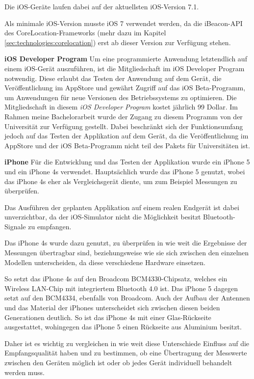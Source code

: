 Die iOS-Geräte laufen dabei auf der aktuellsten iOS-Version 7.1.

Als minimale iOS-Version musste iOS 7 verwendet werden, da die iBeacon-API des CoreLocation-Frameworks (mehr dazu im Kapitel \ref{sec:technologies:corelocation}) erst ab dieser Version zur Verfügung stehen.

\textbf{iOS Developer Program}
Um eine programmierte Anwendung letztendlich auf einem iOS-Gerät auszuführen, ist die Mitgliedschaft im iOS Developer Program notwendig.
Diese erlaubt das Testen der Anwendung auf dem Gerät, die Veröffentlichung im AppStore und gewährt Zugriff auf das iOS Beta-Programm, um Anwendungen für neue Versionen des Betriebssystems zu optimieren.
Die Mitgliedschaft in diesem \emph{iOS Developer Program} kostet jährlich 99 Dollar. 
Im Rahmen meine Bachelorarbeit wurde der Zugang zu diesem Programm von der Universität zur Verfügung gestellt. Dabei beschränkt sich der Funktionsumfang jedoch auf das Testen der Applikation auf dem Gerät, da die Veröffentlichung im AppStore und der iOS Beta-Programm nicht teil des Pakets für Universitäten ist.

\textbf{iPhone}
Für die Entwicklung und das Testen der Applikation wurde ein iPhone 5 und ein iPhone 4s verwendet. 
Hauptsächlich wurde das iPhone 5 genutzt, wobei das iPhone 4s eher als Vergleichsgerät diente, um zum Beispiel Messungen zu überprüfen.

Das Ausführen der geplanten Applikation auf einem realen Endgerät ist dabei unverzichtbar, da der iOS-Simulator nicht die Möglichkeit besitzt Bluetooth-Signale zu empfangen.

Das iPhone 4s wurde dazu genutzt, zu überprüfen in wie weit die Ergebnisse der Messungen übertragbar sind, beziehungsweise wie sie sich zwischen den einzelnen Modellen unterscheiden, da diese verschiedene Hardware einsetzen. 

So setzt das iPhone 4s auf den Broadcom BCM4330-Chipsatz, welches ein Wireless LAN-Chip mit integriertem Bluetooth 4.0 ist. Das iPhone 5 dagegen setzt auf den BCM4334, ebenfalls von Broadcom. 
Auch der Aufbau der Antennen und das Material der iPhones unterscheidet sich zwischen diesen beiden Generationen deutlich. 
So ist das iPhone 4s mit einer Glas-Rückseite ausgestattet, wohingegen das iPhone 5 einen Rückseite aus Aluminium besitzt.

Daher ist es wichtig zu vergleichen in wie weit diese Unterschiede Einfluss auf die Empfangsqualität haben und zu bestimmen, ob eine Übertragung der Messwerte zwischen den Geräten möglich ist oder ob jedes Gerät individuell behandelt werden muss.

